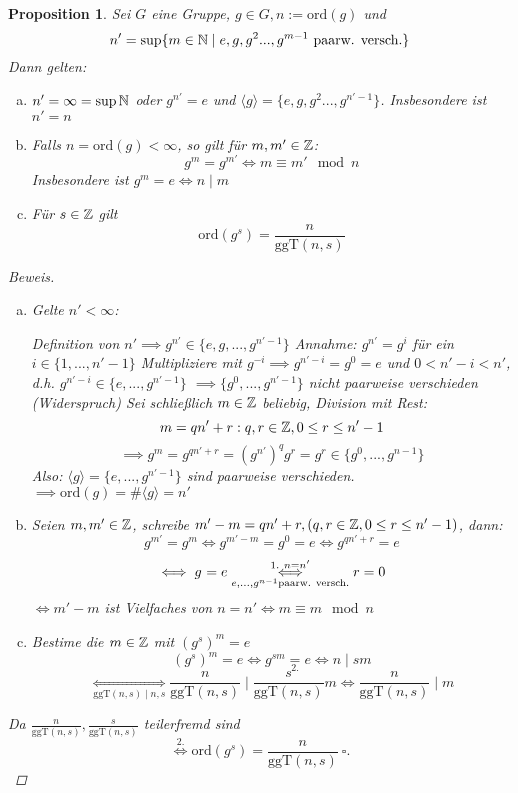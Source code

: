 \documentclass[a4paper]{report}
\theoremstyle{plain}
\newtheorem{prop}[thm]{Proposition}
\theoremstyle{definition}
\begin{document}
\begin{prop} %
Sei $G$ eine Gruppe, $g \in G, n := \mathrm{ord}(g)$ und
$$n' = \sup\{m \in \Bbb N \mid e, g, g^{2} ..., g^{m-1} \text{ paarw. versch.}\}$$
Dann gelten:
\begin{enumerate}[(a)]
\item $n' = \infty = \sup \Bbb N$ oder $g^{n'} = e$ und $\langle g \rangle= \{e, g, g^{2} ..., g^{n'-1}\}$. Insbesondere ist $n'=n$
\item Falls $n = \mathrm{ord}(g) < \infty$, so gilt für $m,m' \in \Bbb Z$: $$g^{m} = g^{m'} \iff m \equiv m' \mod n$$
    Insbesondere ist $g^{m} = e \iff n \mid m$
\item Für $s \in \Bbb Z$ gilt $$\mathrm{ord}(g^{s}) = \frac{n}{\mathrm{ggT}(n,s)}$$
\end{enumerate}
\begin{proof}[Beweis]
  \item
  \begin{enumerate}[(a)]
    \item Gelte $n' < \infty$:

Definition von $n' \implies g^{n'} \in \{e, g, ..., g^{n'-1}\}$
Annahme: $g^{n'} = g^{i}$ für ein $i \in \{1, ..., n'-1\}$
Multipliziere mit $g^{-i} \implies g^{n'-i} = g^{0} = e$ und
$0 < n' - i < n'$, d.h. $g^{n'-i} \in \{e, ..., g^{n'-1}\}$
$\implies \{g^{0}, ..., g^{n'-1}\}$ nicht paarweise verschieden (Widerspruch)
Sei schließlich $m \in \Bbb Z$ beliebig, Division mit Rest: $$m = qn' + r : q,r \in \Bbb Z , 0 \le r \le n' - 1$$
$$\implies g^{m} = g^{qn'+r} = (g^{n'})^{q}g^{r} = g^{r} \in \{g^{0}, ..., g^{n-1}\}$$
Also: $\langle g \rangle = \{e, ..., g^{n'-1}\}$ sind paarweise verschieden. $\implies \mathrm{ord}(g) = \# \langle g \rangle = n'$
\item Seien $m, m' \in \Bbb Z$, schreibe $m'-m = qn'+r, (q, r \in \Bbb Z, 0 \le r \le n'-1)$, dann:
$$g^{m'} = g^{m} \iff g^{m'-m} = g^{0} = e \iff g^{qn'+r} = e$$
$$\iff g^{} = e \overunderset{1.\  n = n'}{e, ..., g^{n-1} \text{paarw. versch.}}\iff r = 0$$
$\iff m' - m$ ist Vielfaches von $n=n' \iff m \equiv m \mod n$
\item Bestime die $m \in \Bbb Z$ mit $(g^{s})^{m} = e$
$$(g^{s})^{m} = e \iff g^{sm} \underset{2.}= e \iff n \mid sm$$
$$\underset{\mathrm{ggT}(n,s) \mid n,s}\iff \frac n{\mathrm{ggT}(n,s)} \mid \frac s{\mathrm{ggT}(n,s)}m \iff \frac{n}{\mathrm{ggT}(n,s)} \mid m$$

  \end{enumerate}

Da $\frac n{\mathrm{ggT}(n,s)},  \frac s{\mathrm{ggT}(n,s)}$ teilerfremd sind
$$\overset{2. }\iff \mathrm{ord}(g^{s}) = \frac n{\mathrm{ggT}(n,s)} \ \square.$$
\end{proof}
\end{prop}
\end{document}
